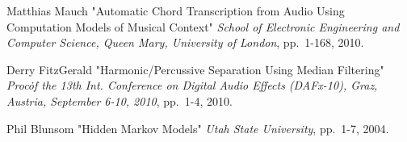 \documentclass{article}
\begin{document}
\begin{thebibliography}{citations}
Matthias Mauch
"Automatic Chord Transcription from Audio Using Computation Models of Musical Context"
{\it School of Electronic Engineering and Computer Science, Queen Mary, University of London},
pp.~1-168, 2010.

Derry FitzGerald
"Harmonic/Percussive Separation Using Median Filtering"
{\it Proc\. of the 13th Int. Conference on Digital Audio Effects (DAFx-10), Graz, Austria, September 6-10, 2010},
pp.~1-4, 2010.

Phil Blunsom
"Hidden Markov Models"
{\it Utah State University},
pp.~1-7, 2004.

\end{thebibliography}

%
\end{document}
